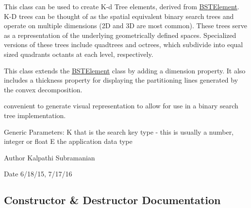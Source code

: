 This class can be used to create K-\/d Tree elements, derived from \mbox{\hyperlink{classbridges_1_1_b_s_t_element}{B\+S\+T\+Element}}. K-\/D trees can be thought of as the spatial equivalent binary search trees and operate on multiple dimensions (2D and 3D are most common). These trees serve as a representation of the underlying geometrically defined spaces. Specialized versions of these trees include quadtrees and octrees, which subdivide into equal sized quadrants octants at each level, respectively. 

This class extends the \mbox{\hyperlink{classbridges_1_1_b_s_t_element}{B\+S\+T\+Element}} class by adding a dimension property. It also includes a thickness property for displaying the partitioning lines generated by the convex decomposition.

convenient to generate visual representation to allow for use in a binary search tree implementation.

Generic Parameters\+: K that is the search key type -\/ this is usually a number, integer or float E the application data type

\begin{DoxyAuthor}{Author}
Kalpathi Subramanian 
\end{DoxyAuthor}
\begin{DoxyDate}{Date}
6/18/15, 7/17/16 
\end{DoxyDate}


\subsection{Constructor \& Destructor Documentation}
\mbox{\label{classbridges_1_1_kd_tree_element_a0a50d048eb39497beed77ed4b0566876}} 
